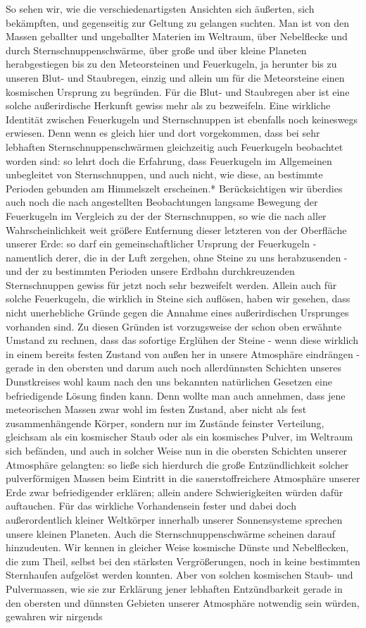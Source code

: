 \documentclass[a4paper, 11pt, oneside, polutonikogreek, german]{article}
\begin{document}
So sehen wir, wie die verschiedenartigsten Ansichten sich äußerten, sich bekämpften, und gegenseitig zur Geltung zu gelangen suchten. Man ist von den Massen geballter und ungeballter Materien im Weltraum, über Nebelflecke und durch Sternschnuppenschwärme, über große und über kleine Planeten herabgestiegen bis zu den Meteorsteinen und Feuerkugeln, ja herunter bis zu unseren Blut- und Staubregen, einzig und allein um für die Meteorsteine einen kosmischen Ursprung zu begründen. Für die Blut- und Staubregen aber ist eine solche außerirdische Herkunft gewiss mehr als zu bezweifeln. Eine wirkliche Identität zwischen Feuerkugeln und Sternschnuppen ist ebenfalls noch keineswegs erwiesen. Denn wenn es gleich hier und dort vorgekommen, dass bei sehr lebhaften Sternschnuppenschwärmen gleichzeitig auch Feuerkugeln beobachtet worden sind: so lehrt doch die Erfahrung, dass Feuerkugeln im Allgemeinen unbegleitet von Sternschnuppen, und auch nicht, wie diese, an bestimmte Perioden gebunden am Himmelszelt erscheinen.* Berücksichtigen wir überdies auch noch die nach angestellten Beobachtungen langsame Bewegung der Feuerkugeln im Vergleich zu der der Sternschnuppen, so wie die nach aller Wahrscheinlichkeit weit größere Entfernung dieser letzteren von der Oberfläche unserer Erde: so darf ein gemeinschaftlicher Ursprung der Feuerkugeln - namentlich derer, die in der Luft zergehen, ohne Steine zu uns herabzusenden - und der zu bestimmten Perioden unsere Erdbahn durchkreuzenden Sternschnuppen gewiss für jetzt noch sehr bezweifelt werden. Allein auch für solche Feuerkugeln, die wirklich in Steine sich auflösen, haben wir gesehen, dass nicht unerhebliche Gründe gegen die Annahme eines außerirdischen Ursprunges vorhanden sind. Zu diesen Gründen ist vorzugsweise der schon oben erwähnte Umstand zu rechnen, dass das sofortige Erglühen der Steine - wenn diese wirklich in einem bereits festen Zustand von außen her in unsere Atmosphäre eindrängen - gerade in den obersten und darum auch noch allerdünnsten Schichten unseres Dunstkreises wohl kaum nach den uns bekannten natürlichen Gesetzen eine befriedigende Lösung finden kann. Denn wollte man auch annehmen, dass jene meteorischen Massen zwar wohl im festen Zustand, aber nicht als fest zusammenhängende Körper, sondern nur im Zustände feinster Verteilung, gleichsam als ein kosmischer Staub oder als ein kosmisches Pulver, im Weltraum sich befänden, und auch in solcher Weise nun in die obersten Schichten unserer Atmosphäre gelangten: so ließe sich hierdurch die große Entzündlichkeit solcher pulverförmigen Massen beim Eintritt in die sauerstoffreichere Atmosphäre unserer Erde zwar befriedigender erklären; allein andere Schwierigkeiten würden dafür auftauchen. Für das wirkliche Vorhandensein fester und dabei doch außerordentlich kleiner Weltkörper innerhalb unserer Sonnensysteme sprechen unsere kleinen Planeten. Auch die Sternschnuppenschwärme scheinen darauf hinzudeuten. Wir kennen in gleicher Weise kosmische Dünste und Nebelflecken, die zum Theil, selbst bei den stärksten Vergrößerungen, noch in keine bestimmten Sternhaufen aufgelöst werden konnten. Aber von solchen kosmischen Staub- und Pulvermassen, wie sie zur Erklärung jener lebhaften Entzündbarkeit gerade in den obersten und dünnsten Gebieten unserer Atmosphäre notwendig sein würden, gewahren wir nirgends 
\end{document}
